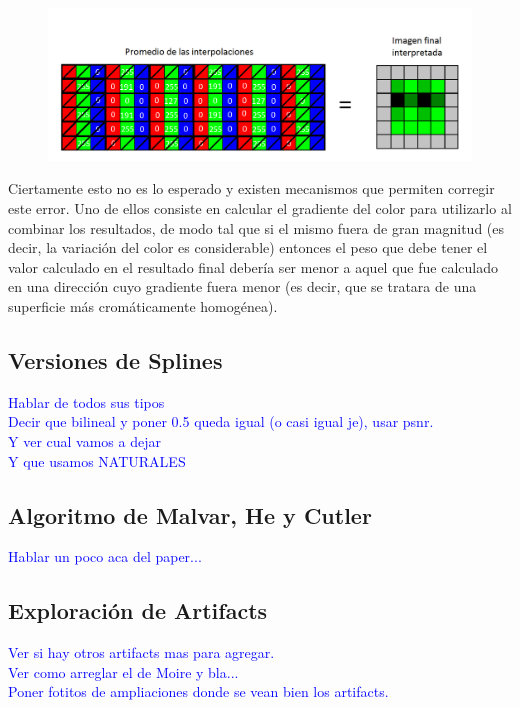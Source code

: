 \documentclass[a4paper]{article}
\begin{document}
\begin{figure}[h!]
	\caption{}
	\begin{center}
	\includegraphics[scale=0.36]{imagenes/apxl3}
	\label{apxl3}
  \end{center}
\end{figure}

Ciertamente esto no es lo esperado y existen mecanismos que permiten corregir este error. Uno de ellos consiste en calcular el gradiente del color para utilizarlo al combinar los resultados, de modo tal que si el mismo fuera de gran magnitud (es decir, la variación del color es considerable) entonces el peso que debe tener el valor calculado en el resultado final debería ser menor a aquel que fue calculado en una dirección cuyo gradiente fuera menor (es decir, que se tratara de una superficie más cromáticamente homogénea).



\pagebreak

\subsection*{Versiones de Splines}

\textcolor{blue}{Hablar de todos sus tipos\\
Decir que bilineal y poner 0.5 queda igual (o casi igual je), usar psnr.\\
Y ver cual vamos a dejar\\
Y que usamos NATURALES}

\newpage
\subsection{Algoritmo de Malvar, He y Cutler}
\textcolor{blue}{Hablar un poco aca del paper...}
\newpage
\subsection{Exploraci\'on de Artifacts}

\textcolor{blue}{Ver si hay otros artifacts mas para agregar.\\
Ver como arreglar el de Moire y bla...\\
Poner fotitos de ampliaciones donde se vean bien los artifacts.}
\end{document}
